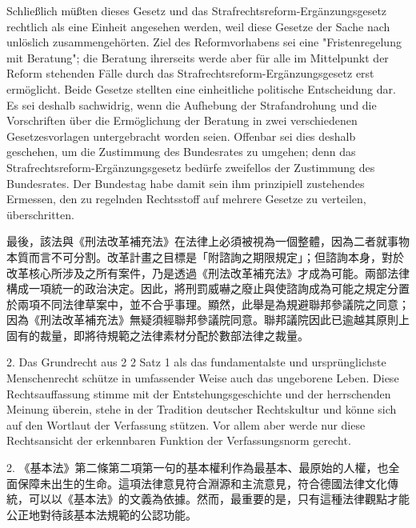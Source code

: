 \documentclass[12pt]{article}
\begin{document}
\syncleft
\begin{sourcepara}
Schließlich müßten dieses Gesetz und das Strafrechtsreform-Ergänzungsgesetz rechtlich als eine Einheit angesehen werden, weil diese Gesetze der Sache nach unlöslich zusammengehörten. Ziel des Reformvorhabens sei eine "Fristenregelung mit Beratung"; die Beratung ihrerseits werde aber für alle im Mittelpunkt der Reform stehenden Fälle durch das Strafrechtsreform-Ergänzungsgesetz erst ermöglicht. Beide Gesetze stellten eine einheitliche politische Entscheidung dar. Es sei deshalb sachwidrig, wenn die Aufhebung der Strafandrohung und die Vorschriften über die Ermöglichung der Beratung in zwei verschiedenen Gesetzesvorlagen untergebracht worden seien. Offenbar sei dies deshalb geschehen, um die Zustimmung des Bundesrates zu umgehen; denn das Strafrechtsreform-Ergänzungsgesetz bedürfe zweifellos der Zustimmung des Bundesrates. Der Bundestag habe damit sein ihm prinzipiell zustehendes Ermessen, den zu regelnden Rechtsstoff auf mehrere Gesetze zu verteilen, überschritten.
\end{sourcepara}
\begin{transpara}
最後，該法與《刑法改革補充法》在法律上必須被視為一個整體，因為二者就事物本質而言不可分割。改革計畫之目標是「附諮詢之期限規定」；但諮詢本身，對於改革核心所涉及之所有案件，乃是透過《刑法改革補充法》才成為可能。兩部法律構成一項統一的政治決定。因此，將刑罰威嚇之廢止與使諮詢成為可能之規定分置於兩項不同法律草案中，並不合乎事理。顯然，此舉是為規避聯邦參議院之同意；因為《刑法改革補充法》無疑須經聯邦參議院同意。聯邦議院因此已逾越其原則上固有的裁量，即將待規範之法律素材分配於數部法律之裁量。
\end{transpara}

\syncleft
\begin{sourcepara}
2. Das Grundrecht aus \abbrArt{} 2 \abbrAbs{} 2 Satz 1 \abbrGG{}\ggfnArtTwoTwoOneDE{} als das fundamentalste und ursprünglichste Menschenrecht schütze in umfassender Weise auch das ungeborene Leben. Diese Rechtsauffassung stimme mit der Entstehungsgeschichte und der herrschenden Meinung überein, stehe in der Tradition deutscher Rechtskultur und könne sich auf den Wortlaut der Verfassung stützen. Vor allem aber werde nur diese Rechtsansicht der erkennbaren Funktion der Verfassungsnorm gerecht.
\end{sourcepara}
\begin{transpara}
2. 《基本法》第二條第二項第一句\ggfnArtTwoTwoOneZH{}的基本權利作為最基本、最原始的人權，也全面保障未出生的生命。這項法律意見符合淵源和主流意見，符合德國法律文化傳統，可以以《基本法》的文義為依據。然而，最重要的是，只有這種法律觀點才能公正地對待該基本法規範的公認功能。
\end{transpara}
\end{document}
